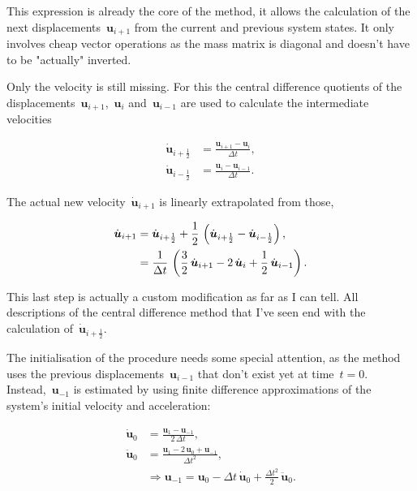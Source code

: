 This expression is already the core of the method, it allows the calculation of the next displacements~$\boldsymbol{u}_{i+1}$ from the current and previous system states.
It only involves cheap vector operations as the mass matrix is diagonal and doesn't have to be "actually" inverted.

Only the velocity is still missing. For this the central difference quotients of the displacements~$\boldsymbol{u}_{i+1}$,~$\boldsymbol{u}_{i}$ and~$\boldsymbol{u}_{i-1}$ are used to calculate the intermediate velocities

\begin{align}
\dot{\boldsymbol{u}}_{i+\frac{1}{2}} &= \frac{\boldsymbol{u}_{i+1} - \boldsymbol{u}_{i}}{\Delta t},\\
\dot{\boldsymbol{u}}_{i-\frac{1}{2}} &= \frac{\boldsymbol{u}_{i} - \boldsymbol{u}_{i-1}}{\Delta t}.
\end{align} 

The actual new velocity~$\dot{\boldsymbol{u}}_{i+1}$ is linearly extrapolated from those,

\begin{align}
\dot{\boldsymbol{u}}_{i+1} &= \dot{\boldsymbol{u}}_{i+\frac{1}{2}} + \frac{1}{2}\,\left(\dot{\boldsymbol{u}}_{i+\frac{1}{2}} - \dot{\boldsymbol{u}}_{i-\frac{1}{2}}\right),\notag\\
&= \frac{1}{\Delta t}\,\left(\frac{3}{2}\,\dot{\boldsymbol{u}}_{i+1} - 2\,\dot{\boldsymbol{u}}_{i} + \frac{1}{2}\,\dot{\boldsymbol{u}}_{i-1}\right).
\end{align}

This last step is actually a custom modification as far as I can tell.
All descriptions of the central difference method that I've seen end with the calculation of~$\dot{\boldsymbol{u}}_{i+\frac{1}{2}}$.

The initialisation of the procedure needs some special attention, as the method uses the previous displacements~$\boldsymbol{u}_{i-1}$ that don't exist yet at time~$t = 0$.
Instead,~$\boldsymbol{u}_{-1}$ is estimated by using finite difference approximations of the system's initial velocity and acceleration:

\begin{align}
\dot{\boldsymbol{u}}_0 &= \frac{\boldsymbol{u}_{1} - \boldsymbol{u}_{-1}}{2\,\Delta t},\\
\ddot{\boldsymbol{u}}_0 &= \frac{\boldsymbol{u}_{1} - 2\,\boldsymbol{u}_{0} + \boldsymbol{u}_{-1}}{\Delta t^2},\\
&\Rightarrow \boldsymbol{u}_{-1} = \boldsymbol{u}_{0} - \Delta t\,\dot{\boldsymbol{u}}_{0} + \frac{\Delta t^2}{2}\,\ddot{\boldsymbol{u}}_{0}.
\end{align}

